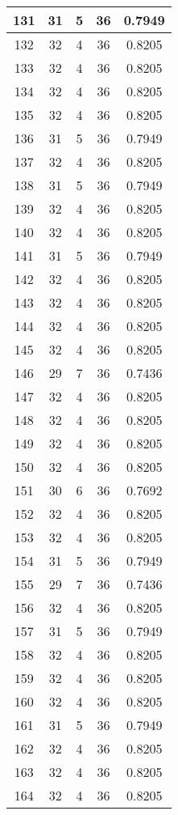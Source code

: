 \documentclass[letterpaper, 12pt]{article}
\begin{document}
\begin{longtable}{|c|c|c|c|c|}
\hline
131 & 31 & 5 & 36 & 0.7949 \\
\hline
132 & 32 & 4 & 36 & 0.8205 \\
\hline
133 & 32 & 4 & 36 & 0.8205 \\
\hline
134 & 32 & 4 & 36 & 0.8205 \\
\hline
135 & 32 & 4 & 36 & 0.8205 \\
\hline
136 & 31 & 5 & 36 & 0.7949 \\
\hline
137 & 32 & 4 & 36 & 0.8205 \\
\hline
138 & 31 & 5 & 36 & 0.7949 \\
\hline
139 & 32 & 4 & 36 & 0.8205 \\
\hline
140 & 32 & 4 & 36 & 0.8205 \\
\hline
141 & 31 & 5 & 36 & 0.7949 \\
\hline
142 & 32 & 4 & 36 & 0.8205 \\
\hline
143 & 32 & 4 & 36 & 0.8205 \\
\hline
144 & 32 & 4 & 36 & 0.8205 \\
\hline
145 & 32 & 4 & 36 & 0.8205 \\
\hline
146 & 29 & 7 & 36 & 0.7436 \\
\hline
147 & 32 & 4 & 36 & 0.8205 \\
\hline
148 & 32 & 4 & 36 & 0.8205 \\
\hline
149 & 32 & 4 & 36 & 0.8205 \\
\hline
150 & 32 & 4 & 36 & 0.8205 \\
\hline
151 & 30 & 6 & 36 & 0.7692 \\
\hline
152 & 32 & 4 & 36 & 0.8205 \\
\hline
153 & 32 & 4 & 36 & 0.8205 \\
\hline
154 & 31 & 5 & 36 & 0.7949 \\
\hline
155 & 29 & 7 & 36 & 0.7436 \\
\hline
156 & 32 & 4 & 36 & 0.8205 \\
\hline
157 & 31 & 5 & 36 & 0.7949 \\
\hline
158 & 32 & 4 & 36 & 0.8205 \\
\hline
159 & 32 & 4 & 36 & 0.8205 \\
\hline
160 & 32 & 4 & 36 & 0.8205 \\
\hline
161 & 31 & 5 & 36 & 0.7949 \\
\hline
162 & 32 & 4 & 36 & 0.8205 \\
\hline
163 & 32 & 4 & 36 & 0.8205 \\
\hline
164 & 32 & 4 & 36 & 0.8205 \\

\end{longtable}
\end{document}
